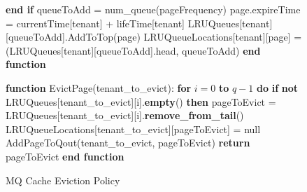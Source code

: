 \begin{figure}[htbp]
\begin{minipage}{\linewidth}
\begin{algorithm}[H]
\begin{algorithmic}
            \STATE \hspace{\algorithmicindent} \textbf{end if}
            \STATE \hspace{\algorithmicindent} queueToAdd = num\_queue(pageFrequency)
            \STATE \hspace{\algorithmicindent} page.expireTime = currentTime[tenant] + lifeTime[tenant]
            \STATE \hspace{\algorithmicindent} LRUQueues[tenant][queueToAdd].AddToTop(page)
            \STATE \hspace{\algorithmicindent} LRUQueueLocations[tenant][page] = (LRUQueues[tenant][queueToAdd].head, queueToAdd)
            \STATE \textbf{end function}

            \STATE
            \STATE \textbf{function} EvictPage(tenant\_to\_evict):
            \STATE \hspace{\algorithmicindent} \textbf{for} $i = 0$ \textbf{to} $q - 1$ \textbf{do}
            \STATE \hspace{\algorithmicindent} \hspace{\algorithmicindent} \textbf{if} \textbf{not} LRUQueues[tenant\_to\_evict][i].\textbf{empty}() \textbf{then}
            \STATE \hspace{\algorithmicindent} \hspace{\algorithmicindent} \hspace{\algorithmicindent} pageToEvict = LRUQueues[tenant\_to\_evict][i].\textbf{remove\_from\_tail}()
            \STATE \hspace{\algorithmicindent} \hspace{\algorithmicindent} \hspace{\algorithmicindent} LRUQueueLocations[tenant\_to\_evict][pageToEvict] = null
            \STATE \hspace{\algorithmicindent} \hspace{\algorithmicindent} \hspace{\algorithmicindent} AddPageToQout(tenant\_to\_evict, pageToEvict)
            \STATE \hspace{\algorithmicindent} \hspace{\algorithmicindent} \textbf{return} pageToEvict
            \STATE \textbf{end function}
        \end{algorithmic}
    \end{algorithm}
    \caption{MQ Cache Eviction Policy}
    \label{fig:mq}
    \end{minipage}
\end{figure}

